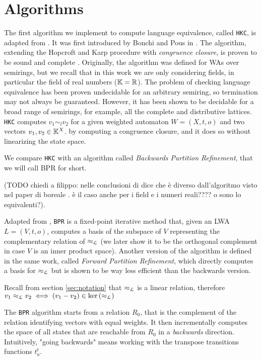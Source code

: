 \section{Algorithms}
The first algorithm we implement to compute language equivalence, called \texttt{HKC},
is adapted from \cite{DBLP:journals/corr/Bonchi0K17}. It was first introduced by 
Bonchi and Pous in \cite{bonchi2013checking}.
The algorithm, extending the Hopcroft and Karp procedure 
\cite{hopcroft1971linear} with \textit{congruence closure}, is 
proven to be sound and complete \cite{DBLP:journals/corr/Bonchi0K17}.
Originally, the algorithm was defined for 
WAs over semirings, but we recall that in this work we are only 
considering fields, in particular 
the field of real numbers ($\mathbb{K} = \mathbb{R}$).
The problem of checking language equivalence 
has been proven undecidable for an arbitrary semiring, so termination 
may not always be guaranteed. However, it has been shown to be decidable
for a broad range of semirings, for example, all the complete and
distributive lattices.
\texttt{HKC} computes $v_1 \sim_l v_2$ for a given weighted automaton
$W = (X, t, o)$ and two vectors $v_1, v_2 \in \mathbb{K}^X$. 
by computing a congruence closure,
and it does so without linearizing the state space. 

We compare \texttt{HKC} with an algorithm called 
\textit{Backwards Partition Refinement}, that we will call BPR for short. 

(TODO chiedi a filippo: nelle conclusioni di \cite{BONCHI201277} dice che è diverso 
dall'algoritmo visto nel paper di boreale \cite{boreale2009weighted}. è il caso 
anche per i field e i numeri reali???? o sono lo equivalenti?).

Adapted from \cite{BONCHI201277}, 
\texttt{BPR} is a fixed-point iterative method that, given an LWA
$L = (V, t, o)$,
computes a basis of the subspace of $V$
representing the complementary relation of $\approx_{\mathcal{L}}$ (we later show it to be the 
orthogonal complement in case $V$ is an inner product space). 
Another version of the algorithm is defined in the same work,
called \textit{Forward Partition Refinement}, which directly computes
a basis for $\approx_{\mathcal{L}}$
but is shown to be way less efficient than the backwards version.


\begin{note}
    Recall from section \ref{sec:notation} that $\approx_{\mathcal{L}}$ is a linear relation, 
    therefore $v_1 \approx_{\mathcal{L}} v_2 \iff (v_1 - v_2) \in \text{ker}\left(\approx_{\mathcal{L}}\right)$
\end{note}


The \texttt{BPR} algorithm starts from a relation $R_0$, that is the complement 
of the relation identifying vectors with equal weights.
It then incrementally computes the space of all states that are reachable from 
$R_0$ in a \textit{backwards} direction. Intuitively, "going backwards" means 
working with the transpose transitions functions $t_a^t$.

